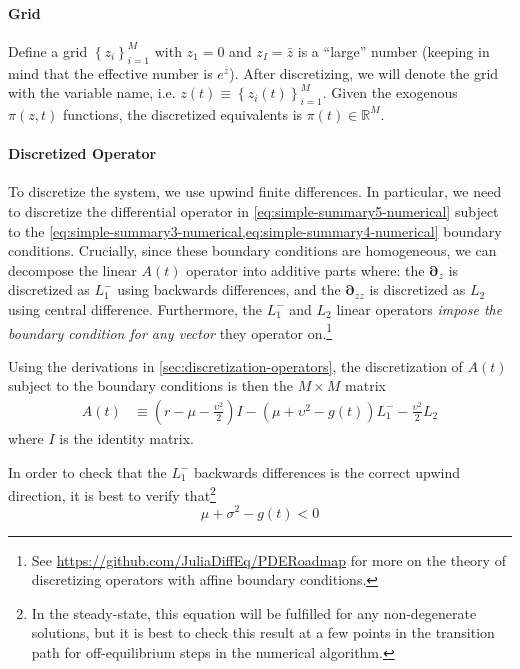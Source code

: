 \documentclass[11pt]{article}
\newcommand{\D}[1][]{\ensuremath{\boldsymbol{\partial}_{#1}}}
\newcommand{\R}{\ensuremath{\mathbb{R}}}
\newcommand{\set}[1]{\ensuremath{\left\{{#1}\right\}}}
\begin{document}
\paragraph{Grid}

Define a  grid $\set{z_i}_{i=1}^M$ with $z_1 = 0$ and $z_I = \bar{z}$ is a ``large'' number (keeping in mind that the effective number is $e^{\bar{z}}$).  After discretizing, we will denote the grid with the variable name, i.e. $z(t) \equiv \set{z_i(t)}_{i=1}^M$.  Given the exogenous $\pi(z,t)$ functions, the discretized equivalents is $\pi(t) \in \R^M$.

\paragraph{Discretized Operator}

To discretize the system, we use upwind finite differences.  In particular, we need to discretize the differential operator in \cref{eq:simple-summary5-numerical} subject to the \cref{eq:simple-summary3-numerical,eq:simple-summary4-numerical} boundary conditions.  Crucially, since these boundary conditions are homogeneous, we can decompose the linear $A(t)$ operator into additive parts where: the $\D[z]$ is discretized as $L^{-}_1$ using backwards differences, and the $\D[zz]$ is discretized as $L_2$ using central difference.   Furthermore, the $L^{-}_1$ and $L_2$ linear operators \textit{impose the boundary condition for any vector} they operator on.\footnote{See \url{https://github.com/JuliaDiffEq/PDERoadmap} for more on the theory of discretizing operators with affine boundary conditions.}

Using the derivations in \cref{sec:discretization-operators}, the discretization of $A(t)$ subject to the boundary conditions is then the $M \times M$ matrix
\begin{align}
A(t) &\equiv \left(r - \mu - \frac{\upsilon^2}{2}\right) I - (\mu + \upsilon^2 - g(t)) L^{-}_1 - \frac{\upsilon^2}{2} L_2\label{eq:A-def-simple}
\end{align}
where $I$ is the identity matrix.

In order to check that the  $L^{-}_1$ backwards differences is the correct upwind direction, it is best to verify that\footnote{In the steady-state, this equation will be fulfilled for any non-degenerate solutions, but it is best to check this result at a few points in the transition path for off-equilibrium steps in the numerical algorithm.}
\begin{equation}
\mu + \sigma^2 - g(t) < 0
\end{equation}
\end{document}
